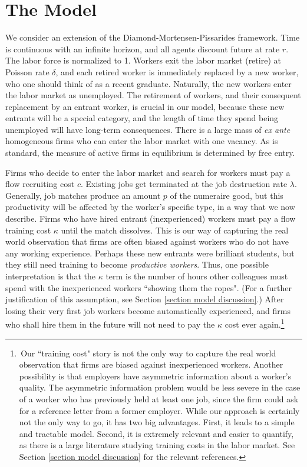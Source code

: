 \documentclass[12pt]{article} %
\theoremstyle{definition}
\begin{document}

\section{The Model}\label{section model}

We consider an extension of the Diamond-Mortensen-Pissarides framework. Time is continuous with an infinite horizon, and all agents discount future at rate $r$. The labor force is normalized to 1. Workers exit the labor market (retire) at Poisson rate $\delta$, and each retired worker is immediately replaced by a new worker, who one should think of as a recent graduate. Naturally, the new workers enter the labor market as unemployed. The retirement of workers, and their consequent replacement by an entrant worker, is crucial in our model, because these new entrants will be a special category, and the length of time they spend being unemployed will have long-term consequences. There is a large mass of \textit{ex ante} homogeneous firms who can enter the labor market with one vacancy. As is standard, the measure of active firms in equilibrium is determined by free entry. 


Firms who decide to enter the labor market and search for workers must pay a flow recruiting cost $c$. Existing jobs get terminated at the job destruction rate $\lambda$. Generally, job matches produce an amount $p$ of the numeraire good, but this productivity will be affected by the worker's specific type, in a way that we now describe. Firms who have hired entrant (inexperienced) workers must pay a flow training cost $\kappa$ until the match dissolves. This is our way of capturing the real world observation that firms are often biased against workers who do not have any working experience. Perhaps these new entrants were brilliant students, but they still need training to become \textit{productive workers}. Thus, one possible interpretation is that the $\kappa$ term is the number of hours other colleagues must spend with the inexperienced workers ``showing them the ropes". (For a further justification of this assumption, see Section \ref{section model discussion}.) After losing their very first job workers become automatically experienced, and firms who shall hire them in the future will not need to pay the $\kappa$ cost ever again.\footnote{\,Our ``training cost" story is not the only way to capture the real world observation that firms are biased against inexperienced workers. Another possibility is that employers have asymmetric information about a worker's quality. The asymmetric information problem would be less severe in the case of a worker who has previously held at least one job, since the firm could ask for a reference letter from a former employer. While our approach is certainly not the only way to go, it has two big advantages. First, it leads to a simple and tractable model. Second, it is extremely relevant and easier to quantify, as there is a large literature studying training costs in the labor market. See Section \ref{section model discussion} for the relevant references.} 
\end{document}
